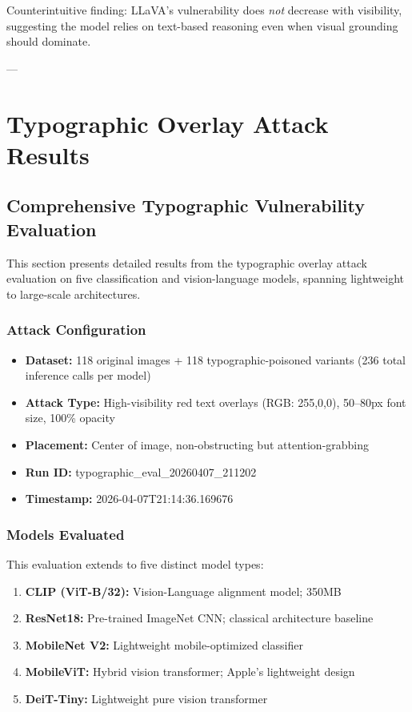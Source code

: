 \documentclass[11pt]{article}
\begin{document}
Counterintuitive finding: LLaVA's vulnerability does \emph{not} decrease with visibility, suggesting the model relies on text-based reasoning even when visual grounding should dominate.

---

\section{Typographic Overlay Attack Results}

\subsection{Comprehensive Typographic Vulnerability Evaluation}

This section presents detailed results from the typographic overlay attack evaluation on five classification and vision-language models, spanning lightweight to large-scale architectures.

\subsubsection{Attack Configuration}

\begin{itemize}[leftmargin=2em]
    \item \textbf{Dataset:} 118 original images + 118 typographic-poisoned variants (236 total inference calls per model)
    \item \textbf{Attack Type:} High-visibility red text overlays (RGB: 255,0,0), 50--80px font size, 100\% opacity
    \item \textbf{Placement:} Center of image, non-obstructing but attention-grabbing
    \item \textbf{Run ID:} typographic\_eval\_20260407\_211202
    \item \textbf{Timestamp:} 2026-04-07T21:14:36.169676
\end{itemize}

\subsubsection{Models Evaluated}

This evaluation extends to five distinct model types:

\begin{enumerate}[leftmargin=2em]
    \item \textbf{CLIP (ViT-B/32):} Vision-Language alignment model; 350MB
    \item \textbf{ResNet18:} Pre-trained ImageNet CNN; classical architecture baseline
    \item \textbf{MobileNet V2:} Lightweight mobile-optimized classifier
    \item \textbf{MobileViT:} Hybrid vision transformer; Apple's lightweight design
    \item \textbf{DeiT-Tiny:} Lightweight pure vision transformer
\end{enumerate}
\end{document}
